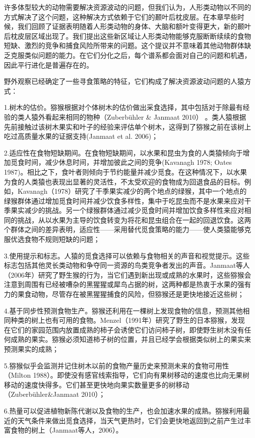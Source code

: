 许多体型较大的动物需要解决资源波动的问题，但我们认为，人形类动物以不同的方式解决了这个问题，这种解决方式依赖于它们的颞叶后枕皮层。在本章早些时候，我们回顾了证据表明随着人形类动物的身体、大脑和额叶变得更大，新的颞叶后枕皮层区域出现了。我们提出这些新区域让人形类动物能够克服断断续续的食物短缺、激烈的竞争和捕食风险所带来的问题。这个提议并不意味着其他动物群体缺乏克服类似问题的能力。在它们分化之后，每个谱系都会面对自己的问题和机遇，因此平行进化是普遍存在的。

野外观察已经确定了一些寻食策略的特征，它们构成了解决资源波动问题的人猿方式：\par
1.树木的估价。猕猴根据对个体树木的估价做出采食选择，其中包括对于除最有经验的类人猿外看起来相同的物种（Zuberbühler \& Janmaat 2010） 。类人猿根据先前接触过该树木果实和叶子的经验来评估单个树木，这得到了猕猴之前在该树上吃过高质量水果的证据支持(Janmaat et al. 2006)；\par
2.适应性在食物短缺期间。在食物短缺期间，以水果和昆虫为食的人类猿倾向于增加觅食时间，减少休息时间，并增加彼此之间的竞争(Kavanagh 1978; Oates 1987)。相比之下，食叶者则倾向于节约能量并减少觅食。在这种情况下，以水果为食的人类猿也表现出显著的灵活性，不太受欢迎的食物成为回退食品的目标。例如，Kavanagh（1978）研究了干季果实减少的两个地点的绿猴，其中一个地点的绿猴群体通过增加觅食时间并减少饮食多样性，集中于吃昆虫而不是水果来应对干季果实减少的挑战。另一个绿猴群体通过减少觅食时间并增加饮食多样性来应对相同的挑战，从以水果为主导的饮食转变为将花和昆虫组合在一起的回退饮食。这两个群体之间的差异表明，适应性——采用替代觅食策略的能力——使人类猿能够克服优选食物不规则短缺的问题；\par
3.使用提示和标志。人猿的觅食选择可以依赖与食物相关的声音和视觉提示。这些标志包括其他灵长类动物和争夺同一资源的鸟类竞争者发出的声音。Janmaat等人（2006年）研究了野生猴的行为，当它们遇到新出现或成熟的水果时，这些猕猴会注意到周围有已经被嘈杂的黑猩猩或犀鸟占据的树，这两种都是热衷于水果的强有力的果食动物，尽管存在被黑猩猩捕食的风险，但猕猴还是更快地接近这些树；\par
4.基于同步性预测食物生产。猕猴还利用在一棵树上发现食物的信息，预测其他相同种类的树上也有可用的食物。Menzel（1991年）研究了野生的日本猕猴，发现在它们的家园范围内放置成熟的柿子会诱使它们访问柿子树，即使野生树木没有任何成熟的果实。猕猴必须知道柿子树的位置，并且已经学会根据类似树上的果实来预测果实的成熟；\par
5.猕猴似乎会监测并记住树木以前的食物产量历史来预测未来的食物可用性（Milton 1988）。即使没有感官线索指导，它们向有果树移动的速度也比向无果树移动的速度快得多。它们甚至更快地向果实数量更多的树移动（Zuberbühler\&Janmaat 2010）；\par
6.热量可以促进植物新陈代谢以及食物的生产，也会加速水果的成熟。猕猴利用最近的天气条件来做出觅食选择，当天气更热时，它们会更快地返回到之前产生过丰富食物的树上（Janmaat等人，2006）。

